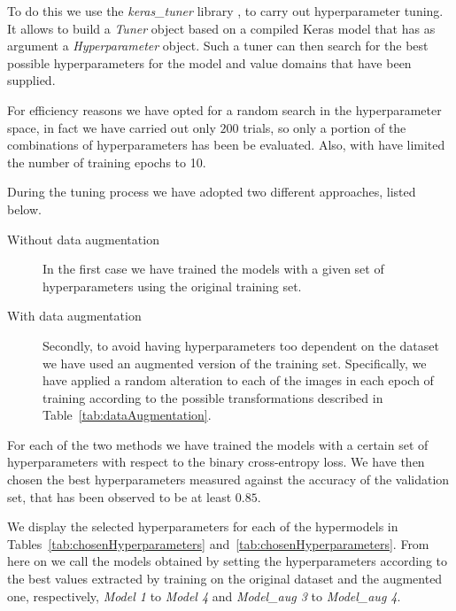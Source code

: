 
   
To do this we use the \textit{keras\_tuner} library \cite{omalley2019kerastuner}, to carry out hyperparameter tuning. It allows to build a \textit{Tuner} object based on a compiled Keras model that has as argument a \textit{Hyperparameter} object. Such a tuner can then search for the best possible hyperparameters for the model and value domains that have been supplied. 

For efficiency reasons we have opted for a random search in the hyperparameter space, in fact we have carried out only $200$ trials, so only a portion of the combinations of hyperparameters has been be evaluated. Also, with have limited the number of training epochs to 10.

During the tuning process we have adopted two different approaches, listed below. 
\begin{description}
    \item[Without data augmentation]  In the first case we have trained the models with a given set of hyperparameters using the original training set.
    \item[With data augmentation]  Secondly, to avoid having hyperparameters too dependent on the dataset we have used an augmented version of the training set. Specifically, we have applied a random alteration to each of the images in each epoch of training according to the possible transformations described in Table~\ref{tab:dataAugmentation}.
\end{description}

For each of the two methods we have trained the models with a certain set of hyperparameters with respect to the binary cross-entropy loss. We have then chosen the best hyperparameters measured against the accuracy of the validation set, that has been observed to be at least $0.85$. 

We display the selected hyperparameters for each of the hypermodels in Tables~\ref{tab:chosenHyperparameters} and~\ref{tab:chosenHyperparameters}. From here on we call the models obtained by setting the hyperparameters according to the best values extracted by training on the original dataset and the augmented one, respectively, \textsl{Model 1} to \textsl{Model 4} and \textsl{Model\_aug 3} to \textsl{Model\_aug 4}.








